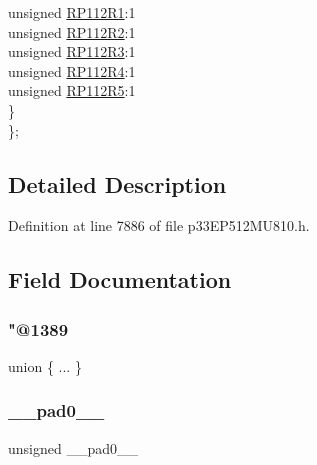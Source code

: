 \begin{DoxyCompactItemize}
\begin{tabbing}
\>\>unsigned \hyperlink{structtag_r_p_o_r12_b_i_t_s_a24c7d448b81b266b7542694618b7fb79}{RP112R1}:1\\
\>\>unsigned \hyperlink{structtag_r_p_o_r12_b_i_t_s_a4b37ab291ad6f9e57c0dc1c4b3b8d772}{RP112R2}:1\\
\>\>unsigned \hyperlink{structtag_r_p_o_r12_b_i_t_s_a054e4b50dd5708cc2c0d8489c761c168}{RP112R3}:1\\
\>\>unsigned \hyperlink{structtag_r_p_o_r12_b_i_t_s_a5942e6583059f524780015b897029ac1}{RP112R4}:1\\
\>\>unsigned \hyperlink{structtag_r_p_o_r12_b_i_t_s_a187168c44785904e874271f8d9efcbe4}{RP112R5}:1\\
\>\} \\
\}; \\

\end{tabbing}\end{DoxyCompactItemize}


\subsection{Detailed Description}


Definition at line 7886 of file p33\+E\+P512\+M\+U810.\+h.



\subsection{Field Documentation}
\mbox{\label{structtag_r_p_o_r12_b_i_t_s_a098787ac6efacb0882c8c6d91aea1dc1}} 
\subsubsection{\texorpdfstring{"@1389}{@1389}}
{\footnotesize\ttfamily union \{ ... \} }

\mbox{\label{structtag_r_p_o_r12_b_i_t_s_adf71f3d8410c1f1dbbc96680a92c49af}} 
\subsubsection{\texorpdfstring{\+\_\+\+\_\+pad0\+\_\+\+\_\+}{\_\_pad0\_\_}}
{\footnotesize\ttfamily unsigned \+\_\+\+\_\+pad0\+\_\+\+\_\+}



